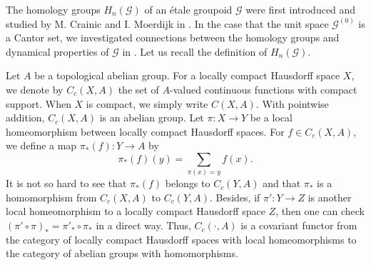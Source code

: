 \documentclass[11pt]{article}
\theoremstyle{definition}
\numberwithin{equation}{section}
\newcommand{\G}{\mathcal{G}}
\begin{document}
The homology groups $H_n(\G)$ of an \'etale groupoid $\G$ were first 
introduced and studied by M. Crainic and I. Moerdijk in \cite{CM00crelle}. 
In the case that the unit space $\G^{(0)}$ is a Cantor set, 
we investigated connections 
between the homology groups and dynamical properties of $\G$ 
in \cite{M12PLMS, M15crelle}. 
Let us recall the definition of $H_n(\G)$. 

Let $A$ be a topological abelian group. 
For a locally compact Hausdorff space $X$, we denote by $C_c(X,A)$ 
the set of $A$-valued continuous functions with compact support. 
When $X$ is compact, we simply write $C(X,A)$. 
With pointwise addition, $C_c(X,A)$ is an abelian group. 
Let $\pi:X\to Y$ be a local homeomorphism 
between locally compact Hausdorff spaces. 
For $f\in C_c(X,A)$, we define a map $\pi_*(f):Y\to A$ by 
\[
\pi_*(f)(y)=\sum_{\pi(x)=y}f(x). 
\]
It is not so hard to see that $\pi_*(f)$ belongs to $C_c(Y,A)$ and 
that $\pi_*$ is a homomorphism from $C_c(X,A)$ to $C_c(Y,A)$. 
Besides, if $\pi':Y\to Z$ is another local homeomorphism to 
a locally compact Hausdorff space $Z$, then 
one can check $(\pi'\circ\pi)_*=\pi'_*\circ\pi_*$ in a direct way. 
Thus, $C_c(\cdot,A)$ is a covariant functor 
from the category of locally compact Hausdorff spaces 
with local homeomorphisms 
to the category of abelian groups with homomorphisms. 
\end{document}
